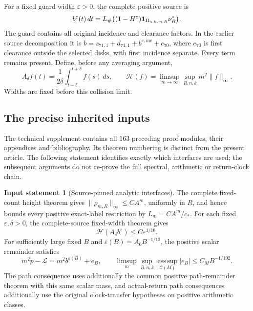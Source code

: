\documentclass[11pt,reqno]{amsart}
\numberwithin{equation}{section}
\theoremstyle{definition}
\newtheorem{inputstatement}[theorem]{Input statement}
\theoremstyle{remark}\newtheorem{remark}[theorem]{Remark}
\newcommand{\esssup}{\operatorname*{ess\,sup}}
\begin{document}
For a fixed guard width $\varepsilon>0$, the complete positive
source is
\begin{equation}\label{eq:v74-full-source}
 b^\varepsilon(t)\,dt
  =L_\#\bigl((1-H^\varepsilon)\mathbf1_{\Pi_{n,k,m,R}}\nu_R^*\bigr).
\end{equation}
The guard contains all original incidence and clearance factors.
In the earlier source decomposition it is
$b=s_{71,1}+d_{71,1}+b^{\varepsilon,\mathrm{inc}}+e_{70}$,
where $e_{70}$ is first clearance outside the selected disks,
with first incidence separate. Every term remains present.
Define, before any averaging argument,
\[
 A_\delta f(t)=\frac1{2\delta}\int_{t-\delta}^{t+\delta}f(s)\,ds,
 \qquad
 \mathcal H(f)=\limsup_{m\to\infty}\sup_{R,n,k}m^2\|f\|_\infty.
\]
Widths are fixed before this collision limit.

\subsection{The precise inherited inputs}
The technical supplement contains all 163 preceding proof modules,
their appendices and bibliography. Its theorem numbering is distinct
from the present article. The following statement identifies exactly
which interfaces are used; the subsequent arguments do not re-prove
the full spectral, arithmetic or return-clock chain.

\begin{inputstatement}[Source-pinned analytic interfaces]
\label{input:v74-dependencies}
The complete fixed-count height theorem gives
$\|\rho_{m,R}\|_\infty\le CA^m$, uniformly in $R$, and hence bounds
every positive exact-label restriction by $L_m=CA^m/c_*$.
For each fixed $\varepsilon,\delta>0$, the complete-source
fixed-width theorem gives
\begin{equation}\label{eq:v74-average-input}
                    \mathcal H(A_\delta b^\varepsilon)
                                         \le C\varepsilon^{1/16}.
\end{equation}
For sufficiently large fixed $B$ and
$\varepsilon(B)=A_0B^{-1/12}$, the positive scalar remainder satisfies
\begin{equation}\label{eq:v74-positive-input}
 m^2p-\mathcal L=m^2b^{\varepsilon(B)}+e_B,
 \qquad \limsup_m\sup_{R,n,k}\esssup_{\mathcal C(M)}|e_B|
                                              \le C_MB^{-1/192}.
\end{equation}
The path consequence uses additionally the common positive
path-remainder theorem with this same scalar mass, and actual-return
path consequences additionally use the original clock-transfer
hypotheses on positive arithmetic classes.
\end{inputstatement}
\end{document}
